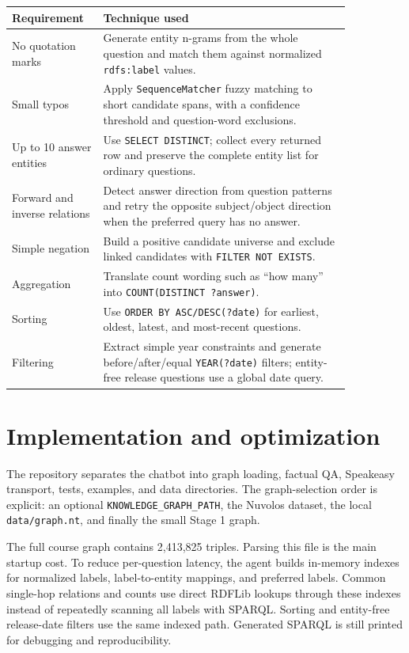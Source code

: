 \documentclass[10pt,a4paper]{article}
\begin{document}
\begin{center}
\small
\begin{tabular}{@{}p{0.20\linewidth}p{0.65\linewidth}@{}}
\toprule
\textbf{Requirement} & \textbf{Technique used} \\
\midrule
No quotation marks & Generate entity n-grams from the whole question and match them against normalized \texttt{rdfs:label} values. \\
Small typos & Apply \texttt{SequenceMatcher} fuzzy matching to short candidate spans, with a confidence threshold and question-word exclusions. \\
Up to 10 answer entities & Use \texttt{SELECT DISTINCT}; collect every returned row and preserve the complete entity list for ordinary questions. \\
Forward and inverse relations & Detect answer direction from question patterns and retry the opposite subject/object direction when the preferred query has no answer. \\
Simple negation & Build a positive candidate universe and exclude linked candidates with \texttt{FILTER NOT EXISTS}. \\
Aggregation & Translate count wording such as ``how many'' into \texttt{COUNT(DISTINCT ?answer)}. \\
Sorting & Use \texttt{ORDER BY ASC/DESC(?date)} for earliest, oldest, latest, and most-recent questions. \\
Filtering & Extract simple year constraints and generate before/after/equal \texttt{YEAR(?date)} filters; entity-free release questions use a global date query. \\
\bottomrule
\end{tabular}
\end{center}

\section{Implementation and optimization}
The repository separates the chatbot into graph loading, factual QA, Speakeasy transport, tests, examples, and data directories. The graph-selection order is explicit: an optional \texttt{KNOWLEDGE\_GRAPH\_PATH}, the Nuvolos dataset, the local \texttt{data/graph.nt}, and finally the small Stage 1 graph.

The full course graph contains 2,413,825 triples. Parsing this file is the main startup cost. To reduce per-question latency, the agent builds in-memory indexes for normalized labels, label-to-entity mappings, and preferred labels. Common single-hop relations and counts use direct RDFLib lookups through these indexes instead of repeatedly scanning all labels with SPARQL. Sorting and entity-free release-date filters use the same indexed path. Generated SPARQL is still printed for debugging and reproducibility.
\end{document}
